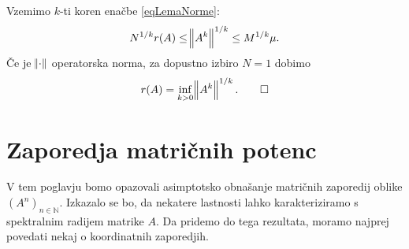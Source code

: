 \documentclass[mat1]{fmfdelo}
\newcommand{\N}{\mathbb N}
\begin{document}
\begin{dokaz}
    Vzemimo $k$-ti koren enačbe \eqref{eqLemaNorme}:
    \begin{equation*}
        N^{1/k} r(A) \leq \norm{A^k}^{1/k} \leq M^{1/k} \mu.
    \end{equation*}
    Če je $\norm{\cdot}$ operatorska norma, za dopustno izbiro $N = 1$ dobimo
    \[r(A) = \inf_{k > 0} \norm{A^k}^{1/k}. \qedhere\]
\end{dokaz}


\section{Zaporedja matričnih potenc}
V tem poglavju bomo opazovali asimptotsko obnašanje matričnih zaporedij oblike $(A^n)_{n\in\N}$. Izkazalo se bo, da nekatere lastnosti lahko karakteriziramo s spektralnim radijem matrike $A$. Da pridemo do tega rezultata, moramo najprej povedati nekaj o koordinatnih zaporedjih.
\end{document}
